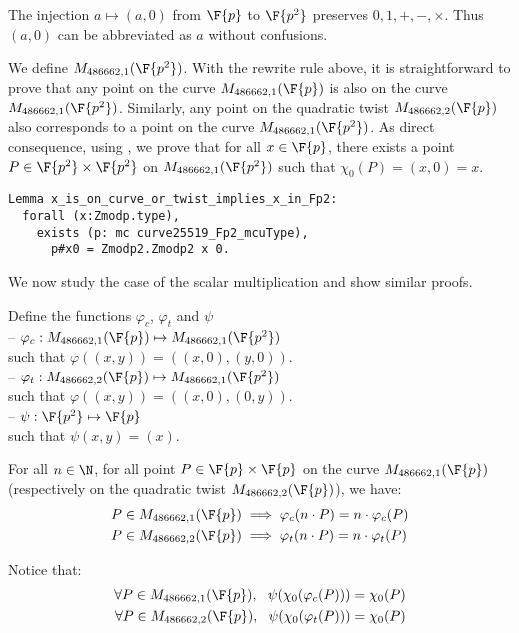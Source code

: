 The injection $a \mapsto (a,0)$ from $\F{p}$ to $\F{p^2}$ preserves
$0, 1, +, -, \times$. Thus $(a,0)$ can be abbreviated as $a$ without confusions.

We define $M_{486662,1}(\F{p^2})$. With the rewrite rule above, it is straightforward
to prove that any point on the curve $M_{486662,1}(\F{p})$ is also on the curve
$M_{486662,1}(\F{p^2})$. Similarly, any point on the quadratic twist
$M_{486662,2}(\F{p})$ also corresponds to a point on the curve $M_{486662,1}(\F{p^2})$.
As direct consequence, using , we prove that for all
$x \in \F{p}$, there exists a point $P \in \F{p^2}\times\F{p^2}$ on
$M_{486662,1}(\F{p^2})$ such that $\chi_0(P) = (x,0) = x$.

\begin{lstlisting}[language=Coq]
Lemma x_is_on_curve_or_twist_implies_x_in_Fp2:
  forall (x:Zmodp.type),
    exists (p: mc curve25519_Fp2_mcuType),
      p#x0 = Zmodp2.Zmodp2 x 0.
\end{lstlisting}

We now study the case of the scalar multiplication and show similar proofs.
\begin{dfn}
Define the functions $\varphi_c$, $\varphi_t$ and $\psi$\\
-- $\varphi_c: M_{486662,1}(\F{p}) \mapsto M_{486662,1}(\F{p^2})$\\
  such that $\varphi((x,y)) = ((x,0), (y,0))$.\\
-- $\varphi_t: M_{486662,2}(\F{p}) \mapsto M_{486662,1}(\F{p^2})$\\
  such that $\varphi((x,y)) = ((x,0), (0,y))$.\\
-- $\psi: \F{p^2} \mapsto \F{p}$\\
  such that $\psi(x,y) = (x)$.
\end{dfn}

\begin{lemma}
  \label{lemma:proj}
  For all $n \in \N$, for all point $P\in\F{p}\times\F{p}$ on the curve
  $M_{486662,1}(\F{p})$ (respectively on the quadratic twist $M_{486662,2}(\F{p})$), we have:
  \begin{align*}
  P \in M_{486662,1}(\F{p}) &\implies \varphi_c(n \cdot P) = n \cdot \varphi_c(P)\\
  P \in M_{486662,2}(\F{p}) &\implies \varphi_t(n \cdot P) = n \cdot \varphi_t(P)
  \end{align*}
\end{lemma}
Notice that:
\begin{align*}
\forall P \in M_{486662,1}(\F{p}),\ \ \psi(\chi_0(\varphi_c(P))) = \chi_0(P)\\
\forall P \in M_{486662,2}(\F{p}),\ \ \psi(\chi_0(\varphi_t(P))) = \chi_0(P)
\end{align*}

